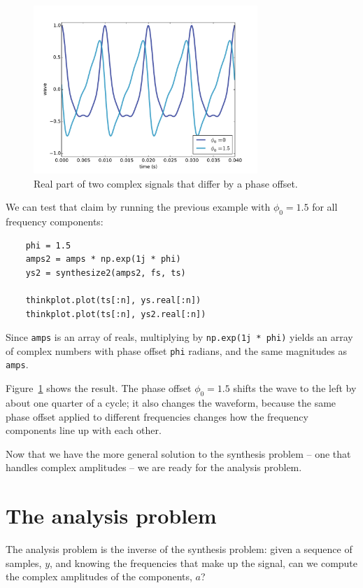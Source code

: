 \documentclass[12pt]{book}
\begin{document}
\begin{figure}
\centerline{\includegraphics[height=2.5in]{figs/dft2.pdf}}
\caption{Real part of two complex signals that differ by a phase
offset.}
\label{fig.dft2}
\end{figure}

We can test that claim by running the previous example with
$\phi_0 = 1.5$ for all frequency components:

\begin{verbatim}
    phi = 1.5
    amps2 = amps * np.exp(1j * phi)
    ys2 = synthesize2(amps2, fs, ts)

    thinkplot.plot(ts[:n], ys.real[:n])
    thinkplot.plot(ts[:n], ys2.real[:n])
\end{verbatim}

Since {\tt amps}
is an array of reals, multiplying by {\tt np.exp(1j * phi)} yields
an array of complex numbers with phase offset {\tt phi} radians, and
the same magnitudes as {\tt amps}.

Figure~\ref{fig.dft2} shows the result.  The phase offset
$\phi_0 = 1.5$ shifts the wave to the left by about one quarter of
a cycle; it also changes the waveform, because the same phase
offset applied to different frequencies changes how the frequency
components line up with each other.

Now that we have the more general solution to the synthesis problem --
one that handles complex amplitudes -- we are ready for the analysis
problem.


\section{The analysis problem}

The analysis problem is the inverse of the synthesis problem: given a
sequence of samples, $y$, and knowing the frequencies
that make up the signal, can we compute the complex amplitudes of the
components, $a$?
\end{document}
